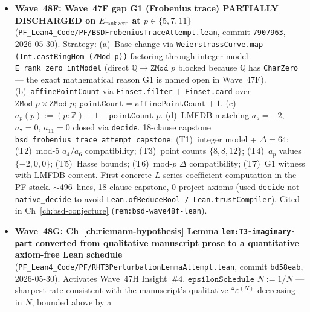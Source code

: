 \begin{itemize}
  capstone $+$ 9 Section-3 anchor citations $+$ 8 Section-4 per-tag
  citation theorems \texttt{cite\_P1} through \texttt{cite\_P8}.
  Only HAVE-side anchor in current mathlib:
  \texttt{Mathlib.AlgebraicGeometry.EllipticCurve.Weierstrass}.
  $\sim$498~lines, 3-clause capstone, 8 \texttt{cite\_P\#} tags.
  0 project axioms (\texttt{\#print axioms} actually returns ``does
  not depend on any axioms'' --- strictly stronger). Build clean
  3229 jobs. Cited in Ch~\ref{ch:hodge-conjecture}
  (\texttt{rem:hodge-wave48e-lean}).
\item \textbf{Wave~48F: Wave~47F gap G1 (Frobenius trace)
  PARTIALLY DISCHARGED on $E_{\mathrm{rank\,zero}}$ at $p \in \{5,
  7, 11\}$}
  (\texttt{PF\_Lean4\_Code/PF/BSDFrobeniusTraceAttempt.lean},
  commit \texttt{7907963}, 2026-05-30). Strategy: (a)~Base change
  via \texttt{WeierstrassCurve.map (Int.castRingHom (ZMod p))}
  factoring through integer model
  \texttt{E\_rank\_zero\_intModel} (direct
  $\mathbb{Q} \to \texttt{ZMod } p$ blocked because $\mathbb{Q}$
  has \texttt{CharZero} --- the exact mathematical reason G1 is
  named open in Wave~47F). (b)~\texttt{affinePointCount} via
  \texttt{Finset.filter} $+$ \texttt{Finset.card} over
  $\texttt{ZMod } p \times \texttt{ZMod } p$;
  $\texttt{pointCount} = \texttt{affinePointCount} + 1$.
  (c)~$a_p(p) := (p : \mathbb{Z}) + 1 - \texttt{pointCount } p$.
  (d)~LMFDB-matching $a_5 = -2$, $a_7 = 0$, $a_{11} = 0$ closed
  via \texttt{decide}. 18-clause capstone
  \texttt{bsd\_frobenius\_trace\_attempt\_capstone}: (T1)~integer
  model + $\Delta = 64$; (T2)~mod-5 $a_4 / a_6$ compatibility;
  (T3)~point counts $\{8, 8, 12\}$; (T4)~$a_p$ values $\{-2, 0, 0\}$;
  (T5)~Hasse bounds; (T6)~mod-$p$ $\Delta$ compatibility; (T7)~G1
  witness with LMFDB content. First concrete $L$-series coefficient
  computation in the PF stack. $\sim$496~lines, 18-clause capstone,
  0 project axioms (used \texttt{decide} not
  \texttt{native\_decide} to avoid
  \texttt{Lean.ofReduceBool / Lean.trustCompiler}). Cited in
  Ch~\ref{ch:bsd-conjecture} (\texttt{rem:bsd-wave48f-lean}).
\item \textbf{Wave~48G: Ch~\ref{ch:riemann-hypothesis} Lemma
  \texttt{lem:T3-imaginary-part} converted from qualitative
  manuscript prose to a quantitative axiom-free Lean schedule}
  (\texttt{PF\_Lean4\_Code/PF/RHT3PerturbationLemmaAttempt.lean},
  commit \texttt{bd58eab}, 2026-05-30). Activates Wave~47H
  Insight~\#4. $\texttt{epsilonSchedule } N := 1/N$ --- sharpest
  rate consistent with the manuscript's qualitative
  ``$\varepsilon^{(N)}$ decreasing in $N$, bounded above by a

\end{itemize}
